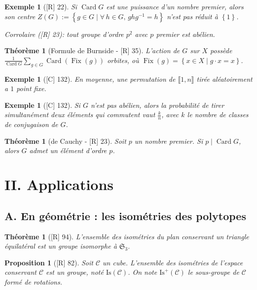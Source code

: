 \documentclass[10pt, a4paper, parskip=full, twoside, twocolumn]{report}
\newtheorem{theorem}[definition]{Théorème}
\newtheorem{proposition}[definition]{Proposition}
\newtheorem{example}[definition]{Exemple}
\DeclareMathOperator{\card}{Card}
\DeclareMathOperator{\Fix}{Fix}
\begin{document}
\begin{example}[\textnormal{[R] 22}]
	Si $\card G$ est une puissance d'un nombre premier, alors son centre $Z(G) := \left\{g\in G\mid \forall\, h\in G,\,ghg^{-1}=h\right\}$ n'est pas réduit à $\left\{1\right\}$.

	Corrolaire \textnormal{([R] 23)}: tout groupe d'ordre $p^2$ avec $p$ premier est abélien.
\end{example}


\begin{theorem}[Formule de Burnside - \textnormal{[R] 35}]
	L'action de $G$ sur $X$ possède $\frac{1}{\card G}\sum_{g\in G} \card(\Fix(g))$
	orbites, où $\Fix(g) = \left\{x\in X \mid g\cdot x = x\right\}$.
\end{theorem}

\begin{example}[\textnormal{[C] 132}]
	En moyenne, une permutation de $\llbracket 1,n\rrbracket$ tirée aléatoirement a $1$ point fixe.
\end{example}
\begin{example}[\textnormal{[C] 132}]
	Si $G$ n'est pas abélien, alors la probabilité de tirer simultanément deux éléments qui commutent vaut $\frac{k}{n}$, avec $k$ le nombre de classes de conjugaison de $G$.
\end{example}

\begin{theorem}[de Cauchy - \textnormal{[R] 23}]
	Soit $p$ un nombre premier. Si $p\mid \card G$, alors $G$ admet un élément d'ordre $p$.
\end{theorem}

\section*{II. Applications}
\subsection*{A. En géométrie : les isométries des polytopes}
\begin{theorem}[\textnormal{[R] 94}]
	L'ensemble des isométries du plan conservant un triangle équilatéral est un groupe isomorphe à $\mathfrak{S}_3$.
\end{theorem}

\begin{proposition}[\textnormal{[R] 82}]
	Soit $\mathcal{C}$ un cube. L'ensemble des isométries de l'espace conservant $\mathcal{C}$ est un groupe, noté $\text{Is}(\mathcal{C})$.
	On note $\text{Is}^+(\mathcal{C})$ le sous-groupe de $\mathcal{C}$ formé de rotations.
\end{proposition}
\end{document}
